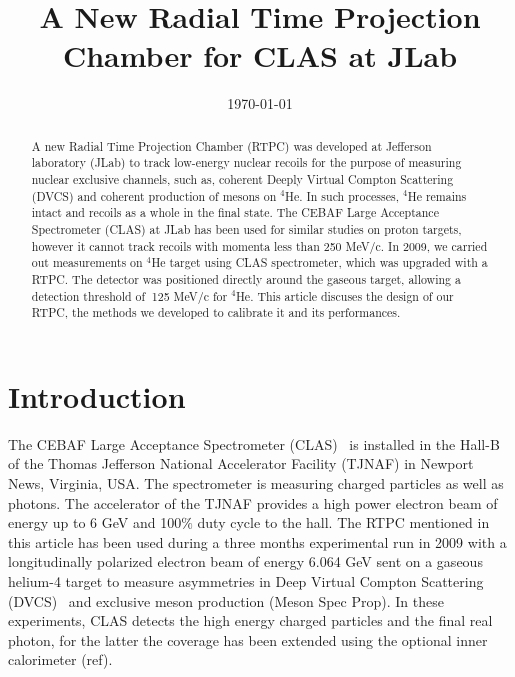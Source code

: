 \documentclass[aps,prl,twocolumn,showpacs,superscriptaddress,groupedaddress]{revtex4}
\begin{document}

\title{\vspace{-15mm}\fontsize{24pt}{10pt}\selectfont\textbf{A New Radial Time Projection Chamber for CLAS at JLab}}
  

\date{\today}

\begin{abstract}
A new Radial Time Projection Chamber (RTPC) was developed at Jefferson 
laboratory (JLab) to track low-energy nuclear recoils for the purpose of 
measuring nuclear exclusive channels, such as, coherent Deeply Virtual Compton 
Scattering (DVCS) and coherent production of mesons on $^4$He. In such 
processes, $^4$He remains intact and recoils as a whole in the final state. The 
CEBAF Large Acceptance Spectrometer (CLAS) at JLab has been used for similar 
studies on proton targets, however it cannot track recoils with momenta less 
than 250 MeV/c. In 2009, we carried out measurements on $^4$He target using
CLAS spectrometer, which was upgraded with a RTPC. The detector was positioned 
directly around the gaseous target, allowing a detection threshold of $~$125  
MeV/c for $^4$He. This article discuses the design of our RTPC, the methods we 
developed to calibrate it and its performances.
\end{abstract}

\maketitle


\section{\label{sec:level1} Introduction}

The CEBAF Large Acceptance Spectrometer (CLAS)~\cite{CLASref} is installed in 
the Hall-B of the Thomas Jefferson National Accelerator Facility (TJNAF) in 
Newport News, Virginia, USA. The spectrometer is measuring charged particles as 
well as photons. The accelerator of the TJNAF provides a high power electron 
beam of energy up to 6 GeV and 100$\%$ duty cycle to the hall. The RTPC 
mentioned in this article has been used during a three months experimental run 
in 2009 with a longitudinally polarized electron beam of energy 6.064 GeV sent 
on a gaseous helium-4 target to measure asymmetries in Deep Virtual Compton 
Scattering (DVCS)~\cite{proposal} and exclusive meson production (Meson Spec 
Prop). In these experiments, CLAS detects the high energy charged particles and 
the final real photon, for the latter the coverage has been extended using the 
optional inner calorimeter (ref). 
\end{document}
